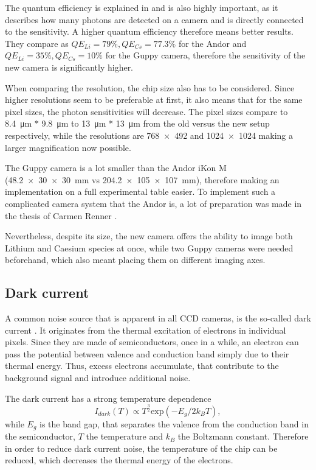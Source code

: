 The quantum efficiency is explained in  and is also highly important, as it describes how many photons are detected on a camera and is directly connected to the sensitivity. A higher quantum efficiency therefore means better results. They compare as $QE_{Li} = 79\%, QE_{Cs} = 77.3\%$ for the Andor and $QE_{Li} = 35\%, QE_{Cs} = 10\%$ for the Guppy camera, therefore the sensitivity of the new camera is significantly higher.

When comparing the resolution, the chip size also has to be considered. Since higher resolutions seem to be preferable at first, it also means that for the same pixel sizes, the photon sensitivities will decrease. The pixel sizes compare to \SI{8.4}{\micro\meter} $*$ \SI{9.8}{\micro\meter} to \SI{13}{\micro\meter} * \SI{13}{\micro\meter} from the old versus the new setup respectively, while the resolutions are \SI{768x492}{} and \SI{1024x1024}{} making a larger magnification now possible.

The Guppy camera is a lot smaller than the Andor iKon M (\SI{48.2x30x30}{\milli\meter} vs \SI{204.2x105x107}{\milli\meter}), therefore making an implementation on a full experimental table easier. To implement such a complicated camera system that the Andor is, a lot of preparation was made in the thesis of Carmen Renner \cite{Renner2014}.

Nevertheless, despite its size, the new camera offers the ability to image both Lithium and Caesium species at once, while two Guppy cameras were needed beforehand, which also meant placing them on different imaging axes.

\subsection{Dark current}
A common noise source that is apparent in all CCD cameras, is the so-called dark current \cite{Ottenstein2006} . It originates from the thermal excitation of electrons in individual pixels. Since they are made of semiconductors, once in a while, an electron can pass the potential between valence and conduction band simply due to their thermal energy. Thus, excess electrons accumulate, that contribute to the background signal and introduce additional noise\cite{FP362011}.

The dark current has a strong temperature dependence
\begin{equation}
\label{eq:darkcurrent}
I_{dark}(T) \propto T^{\frac{3}{2}} \mathrm{exp}(-E_g/2k_BT),
\end{equation}
while $E_g$ is the band gap, that separates the valence from the conduction band in the semiconductor, $T$ the temperature and $k_B$ the Boltzmann constant.
Therefore in order to reduce dark current noise, the temperature of the chip can be reduced, which decreases the thermal energy of the electrons.

